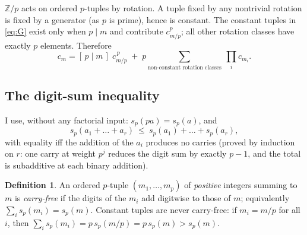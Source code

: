 \documentclass[11pt]{amsart}
\theoremstyle{definition}
\newtheorem{definition}[theorem]{Definition}
\theoremstyle{remark}
\newcommand{\Z}{\mathbb Z}
\newcommand{\sd}{s_p}
\begin{document}
$\Z/p$ acts on ordered $p$-tuples by rotation. A tuple fixed by any nontrivial
rotation is fixed by a generator (as $p$ is prime), hence is constant. The
constant tuples in \eqref{eq:G} exist only when $p\mid m$ and contribute
$c_{m/p}^p$; all other rotation classes have exactly $p$ elements. Therefore
\begin{equation}\label{eq:neck}
  c_m=[\,p\mid m\,]\;c_{m/p}^{\,p}
   \;+\;p\!\!\sum_{\text{non-constant rotation classes}}\ \prod_i c_{m_i}.
\end{equation}

\subsection{The digit-sum inequality}

I use, without any factorial input: $\sd(pa)=\sd(a)$, and
\begin{equation}\label{eq:subadd}
  \sd(a_1+\dots+a_r)\ \le\ \sd(a_1)+\dots+\sd(a_r),
\end{equation}
with equality iff the addition of the $a_i$ produces no carries (proved by
induction on $r$: one carry at weight $p^j$ reduces the digit sum by exactly
$p-1$, and the total is subadditive at each binary addition).

\begin{definition}\label{def:cf}
An ordered $p$-tuple $(m_1,\dots,m_p)$ of \emph{positive} integers summing to
$m$ is \emph{carry-free} if the digits of the $m_i$ add digitwise to those of
$m$; equivalently $\sum_i\sd(m_i)=\sd(m)$. Constant tuples are never
carry-free: if $m_i=m/p$ for all $i$, then
$\sum_i\sd(m_i)=p\,\sd(m/p)=p\,\sd(m)>\sd(m)$.
\end{definition}
\end{document}
